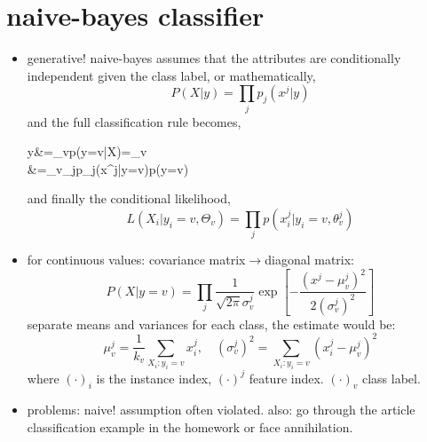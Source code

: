 \documentclass{article}
\begin{document}
\section{naive-bayes classifier}
\begin{itemize}
	\item generative! naive-bayes assumes that the attributes are conditionally independent
		given the class label, or mathematically, 
		\begin{equation}
			P(X|y)=\prod_jp_j(x^j|y)
		\end{equation}
		and the full classification rule becomes, 
		\begin{flalign}
			\hat y&=\arg\max_vp(y=v|X)=\arg\max_v
				\nonumber \\ 	&=\arg\max_v\prod_jp_j(x^j|y=v)p(y=v)
		\end{flalign}
		and finally the conditional likelihood, 
		\begin{equation}
			L(X_i|y_i=v,\Theta_v)=\prod_jp(x_i^j|y_i=v,\theta_v^j)
		\end{equation}
	\item for continuous values: covariance matrix${}\rightarrow{}$diagonal matrix:
		\begin{equation}
			P(X|y=v)=\prod_j\frac1{\sqrt{2\pi}{\sigma_v^j}}
				\exp\left[-\frac{(x^j-\mu_v^j)^2}{2(\sigma_v^j)^2}\right]
		\end{equation}
		separate means and variances for each class, the estimate would be:
		\begin{equation}
			\mu_v^j=\frac1{k_v}\sum_{X_i:y_i=v}x_i^j,\quad
			(\sigma_v^j)^2=\sum_{X_i:y_i=v}\left(x_i^j-\mu_v^j\right)^2
		\end{equation}
		where $(\cdot)_i$ is the instance index, $(\cdot)^j$ feature index. 
		$(\cdot)_v$ class label. 
	\item problems: naive! assumption often violated. also: go through the 
		article classification example in the homework or face annihilation. 
\end{itemize}
\end{document}
